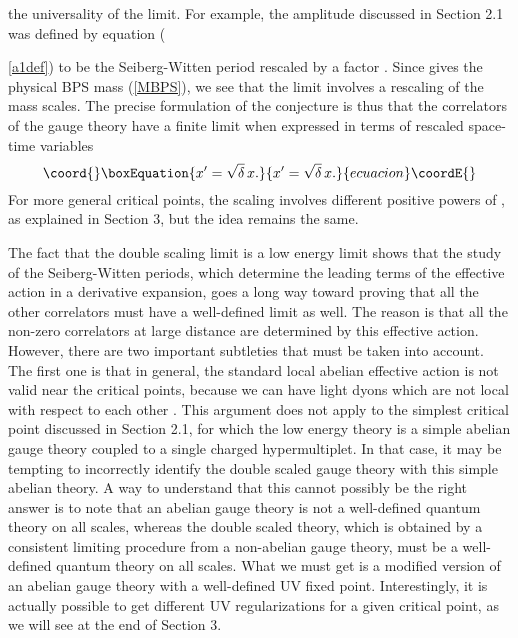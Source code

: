 \documentclass[a4paper,12pt]{article}
\begin{document}
the universality of the limit. For example, the amplitude \coordHE{} discussed in Section 2.1 was defined by equation ({\ref{a1def})
to be the Seiberg-Witten period \coordHE{}
rescaled by a factor \coordHE{}. Since \coordHE{} gives the physical
BPS mass (\ref{MBPS}), we see that the limit involves a rescaling of the
mass scales. The precise formulation of the
conjecture is thus that the correlators of
the gauge theory have a finite limit when expressed in terms of rescaled
space-time variables
%
\begin{equation}\coord{}\boxEquation{
\label{xnew}
x' = \sqrt{\delta}\, x.
}{
x' = \sqrt{\delta}\, x.
}{ecuacion}\coordE{}\end{equation}
%
For more general critical points, the scaling involves different
positive powers of \myHighlight{$\delta$}\coordHE{}, as explained in Section 3, but the idea 
remains the same.

The fact that the double scaling limit is a low energy limit shows
that the study of the Seiberg-Witten periods, which determine the leading
terms of the effective action in a derivative expansion, goes a long way
toward proving that all the other correlators must have a well-defined
limit as well. The reason is that all the non-zero correlators at large
distance are determined by this effective action.  
However, there are two important subtleties that must be taken into 
account. The first one is that in general, the standard local abelian
effective action is not valid near the critical points, because we can 
have light dyons which are not local with respect to each other \cite{AD}.
This argument does not apply to
the simplest critical point discussed in Section 2.1, for which the low
energy theory is a simple abelian gauge theory coupled to a single
charged hypermultiplet. In that case, it may be tempting to incorrectly
identify the double scaled gauge theory with this simple abelian theory.
A way to understand that this cannot possibly be the right answer
is to note that an abelian gauge theory is not a well-defined quantum
theory on all scales, whereas the double scaled theory, which is obtained
by a consistent limiting procedure from a non-abelian gauge theory, must
be a well-defined quantum theory on all scales. What we must get is a
modified version of an abelian gauge theory with a well-defined UV fixed
point. Interestingly, it is actually possible to get different UV
regularizations for a given critical point, as we will see at the end of
Section 3. 

}
\end{document}
